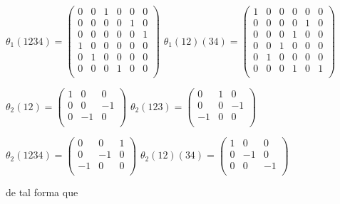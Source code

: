 \documentclass[12pt]{book}
\theoremstyle{definition}
\newcounter{in}
\begin{document}
\begin{center}
  $\theta_{1}(1234)= \left(
    \begin{array}{rrrrrr}
      0 & 0 & 1 & 0 & 0 & 0\\
      0 & 0 & 0 & 0 & 1 & 0\\
      0 & 0 & 0 & 0 & 0 & 1\\
      1 & 0 & 0 & 0 & 0 & 0\\
      0 & 1 & 0 & 0 & 0 & 0\\
      0 & 0 & 0 & 1 & 0 & 0\\
    \end{array} 
  \right)$ \quad
  $\theta_{1}(12)(34)= \left(
    \begin{array}{rrrrrr}
      1 & 0 & 0 & 0 & 0 & 0\\
      0 & 0 & 0 & 0 & 1 & 0\\
      0 & 0 & 0 & 1 & 0 & 0\\
      0 & 0 & 1 & 0 & 0 & 0\\
      0 & 1 & 0 & 0 & 0 & 0\\
      0 & 0 & 0 & 1 & 0 & 1\\
    \end{array} 
  \right)$ 
\end{center}

\begin{center}
  $\theta_{2}(12)= \left(
    \begin{array}{rrr}
      1 & 0 & 0 \\
      0 & 0 & -1 \\
      0 & -1 & 0 \\
    \end{array} 
  \right)$ \quad
  $\theta_{2}(123)= \left(
    \begin{array}{rrr}
      0 & 1 & 0 \\
      0 & 0 & -1 \\
      -1 & 0 & 0 \\
    \end{array} 
  \right)$
\end{center}

\begin{center}
  $\theta_{2}(1234)= \left(
    \begin{array}{rrr}
      0 & 0 & 1 \\
      0 & -1 & 0 \\
      -1 & 0 & 0 \\
    \end{array} 
  \right)$ \quad
  $\theta_{2}(12)(34)= \left(
    \begin{array}{rrr}
      1 & 0 & 0 \\
      0 & -1& 0 \\
      0 & 0 & -1 \\
    \end{array} 
  \right)$
\end{center}
de tal forma que
\end{document}
